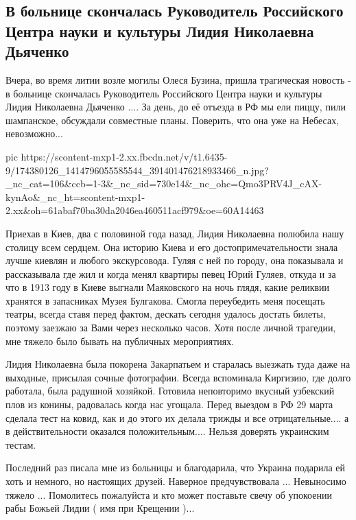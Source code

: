  
 
 
 
 
\subsection{В больнице скончалась Руководитель Российского Центра науки и культуры Лидия Николаевна Дьяченко}

Вчера, во время литии возле могилы Олеся Бузина, пришла трагическая новость - в
больнице скончалась Руководитель Российского Центра науки и культуры Лидия
Николаевна Дьяченко .... За день, до её отъезда в РФ мы ели пиццу, пили
шампанское, обсуждали совместные планы. Поверить, что она уже на Небесах,
невозможно... 

\ifcmt
  pic https://scontent-mxp1-2.xx.fbcdn.net/v/t1.6435-9/174380126_1414796055585544_391401476218933466_n.jpg?_nc_cat=106&ccb=1-3&_nc_sid=730e14&_nc_ohc=Qmo3PRV4J_cAX-kynAo&_nc_ht=scontent-mxp1-2.xx&oh=61abaf70ba30da2046ea460511acf979&oe=60A14463
\fi

Приехав в Киев, два с половиной года назад, Лидия Николаевна полюбила нашу
столицу всем сердцем. Она историю Киева и его достопримечательности знала лучше
киевлян и любого экскурсовода. Гуляя с ней по городу, она показывала и
рассказывала где жил и когда менял квартиры певец Юрий Гуляев, откуда и за что
в 1913 году в Киеве выгнали Маяковского на ночь глядя, какие реликвии хранятся
в запасниках Музея Булгакова. Смогла переубедить меня посещать театры, всегда
ставя перед фактом, дескать сегодня удалось достать билеты, поэтому заезжаю за
Вами через несколько часов. Хотя после личной трагедии, мне тяжело было бывать
на публичных мероприятиях. 

Лидия Николаевна была покорена Закарпатьем и старалась выезжать туда даже на
выходные, присылая сочные фотографии. Всегда вспоминала Киргизию, где долго
работала, была радушной хозяйкой. Готовила неповторимо вкусный узбекский плов
из конины, радовалась когда нас угощала. Перед выездом в РФ 29 марта сделала
тест на ковид, как и до этого их делала трижды и все отрицательные.... а в
действительности оказался положительным.... Нельзя доверять украинским тестам. 

Последний раз писала мне из больницы и благодарила, что Украина подарила ей
хоть и немного, но настоящих друзей. Наверное предчувствовала ... Невыносимо
тяжело ... Помолитесь пожалуйста и кто может поставьте свечу об упокоении рабы
Божьей Лидии ( имя при Крещении )...
